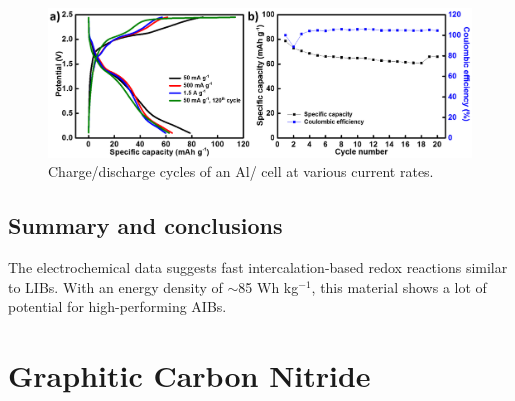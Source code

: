 \begin{figure}[th!]
\centering
\includegraphics[width=\textwidth]{Figures/chap6fig/MoO3cdcce}
\caption{Charge/discharge cycles of an Al/ cell at various current rates.}
\label{Figures/chap6fig:MoO3cdcce}
\end{figure}

\subsection{Summary and conclusions}
The electrochemical data suggests fast intercalation-based redox reactions similar to LIBs. With an energy density of $\sim$85 Wh kg$^{-1}$, this material shows a lot of potential for high-performing AIBs. 


\section{Graphitic Carbon Nitride}

